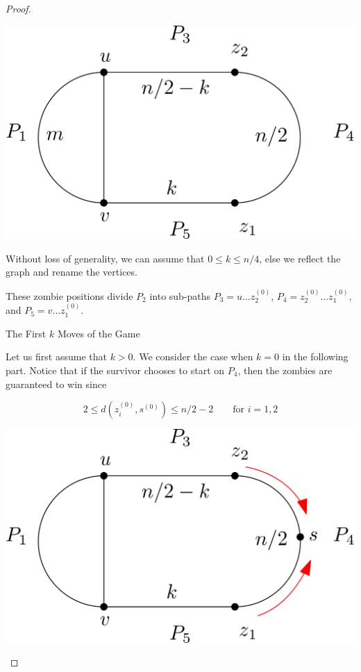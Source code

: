 \documentclass[letterpaper, 10pt]{article}
\begin{document}
\begin{proof}
\begin{proofpart}
\begin{center}
\includegraphics[scale=0.15]{diagram1.png}
\end{center}

Without loss of generality, we can assume that $0 \leq k \leq n/4$,
else we reflect the graph and rename the vertices.

These zombie positions divide $P_2$ into sub-paths $P_3 = u \dots z_2^{(0)}$,
$P_4 = z_2^{(0)} \dots z_1^{(0)}$, and
$P_5 = v \dots z_1^{(0)}$.
\end{proofpart}

\begin{proofpart} The First $k$ Moves of the Game

Let us first assume that $k>0$. We consider the case when $k=0$ in the following part.
Notice that if the survivor chooses to start on $P_4$, then the zombies are guaranteed to win
since

\[ 2 \leq d(z_i^{(0)}, s^{(0)}) \leq n/2 - 2 \qquad \text{for $i = 1,2$} \]

\begin{center}
\includegraphics[scale=0.15]{diagram3}
\end{center}


\end{proofpart}
\end{proof}
\end{document}
